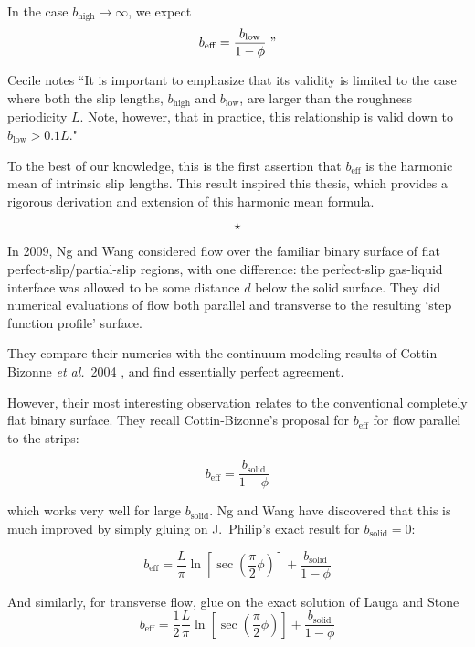 \documentclass[a4paper]{report}
\newcommand{\beff}{\ensuremath{b_{\mathrm{eff}}}}
\newcommand{\bhigh}{\ensuremath{b_{\mathrm{high}}}}
\newcommand{\blow}{\ensuremath{b_{\mathrm{low}}}}
\newcommand{\sep}{\begin{equation*} \star \end{equation*}}
\begin{document}
In the case $b_{\mathrm{high}} \rightarrow \infty$, we expect
\begin{equation*}
\beff = \frac{b_{\mathrm{low}}}{1-\phi} \;"
\end{equation*}

Cecile notes ``It is important to emphasize that its validity is limited to the case where both the slip lengths, $\bhigh$ and $\blow$, are larger than the roughness periodicity $L$. Note, however, that in practice, this relationship is valid down to $\blow > 0.1L$."

To the best of our knowledge, this is the first assertion that $\beff$ is the harmonic mean of intrinsic slip lengths.  This result inspired this thesis, which provides a rigorous derivation and extension of this harmonic mean formula.

\sep

In 2009, Ng and Wang \cite{NgWang2009} considered flow over the familiar binary surface of flat perfect-slip/partial-slip regions, with one difference: the perfect-slip gas-liquid interface was allowed to be some distance $d$ below the solid surface.  They did numerical evaluations of flow both parallel and transverse to the resulting `step function profile' surface.

They compare their numerics with the continuum modeling results of Cottin-Bizonne \emph{et al.}\ 2004 \cite{Cottin-Bizonne2004}, and find essentially perfect agreement.

However, their most interesting observation relates to the conventional completely flat binary surface.  They recall Cottin-Bizonne's proposal for $\beff$ for flow parallel to the strips:

\begin{equation*}
\beff = \frac{b_{\mathrm{solid}}}{1 - \phi}
\end{equation*}

which works very well for large $b_{\mathrm{solid}}$.  Ng and Wang have discovered that this is much improved by simply gluing on J.\ Philip's exact result \cite{Philip1972} for $b_{\mathrm{solid}}=0$:

\begin{equation*}
\beff =  \frac{L}{\pi} \ln \left[ \sec \left( \frac{\pi}{2} \phi \right) \right] +
 \frac{b_{\mathrm{solid}}}{1 - \phi}
\end{equation*}

And similarly, for transverse flow, glue on the exact solution of Lauga and Stone \cite{LaugaStone2003}
\begin{equation*}
\beff = \frac{1}{2}  \frac{L}{\pi} \ln \left[ \sec \left( \frac{\pi}{2} \phi \right) \right] +
 \frac{b_{\mathrm{solid}}}{1 - \phi}
\end{equation*}
\end{document}
